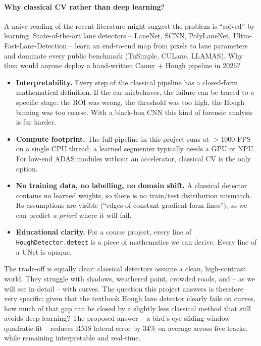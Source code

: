 \paragraph{Why classical CV rather than deep learning?}
A naive reading of the recent literature might suggest the problem is
``solved'' by learning. State-of-the-art lane detectors -- LaneNet,
SCNN, PolyLaneNet, Ultra-Fast-Lane-Detection -- learn an end-to-end
map from pixels to lane parameters and dominate every public benchmark
(TuSimple, CULane, LLAMAS). Why then would anyone deploy a
hand-written Canny + Hough pipeline in 2026?
\begin{itemize}[leftmargin=1.4em,itemsep=2pt]
  \item \textbf{Interpretability.} Every step of the classical pipeline
        has a closed-form mathematical definition. If the car
        misbehaves, the failure can be traced to a specific stage: the
        ROI was wrong, the threshold was too high, the Hough binning
        was too coarse. With a black-box CNN this kind of forensic
        analysis is far harder.
  \item \textbf{Compute footprint.} The full pipeline in this project
        runs at $>1000$ FPS on a single CPU thread; a learned
        segmenter typically needs a GPU or NPU. For low-end ADAS
        modules without an accelerator, classical CV is the only
        option.
  \item \textbf{No training data, no labelling, no domain shift.}
        A classical detector contains no learned weights, so there is
        no train/test distribution mismatch. Its assumptions are
        visible (``edges of constant gradient form lines''), so we can
        predict \emph{a priori} where it will fail.
  \item \textbf{Educational clarity.} For a course project, every line
        of \texttt{HoughDetector.detect} is a piece of mathematics we
        can derive. Every line of a UNet is opaque.
\end{itemize}
The trade-off is equally clear: classical detectors assume a clean,
high-contrast world. They struggle with shadows, weathered paint,
crowded roads, and -- as we will see in detail -- with curves. The
question this project answers is therefore very specific: given that
the textbook Hough lane detector clearly fails on curves, how much of
that gap can be closed by a slightly less classical method that still
avoids deep learning? The proposed answer -- a bird's-eye
sliding-window quadratic fit -- reduces RMS lateral error by $34\%$ on
average across five tracks, while remaining interpretable and
real-time.


